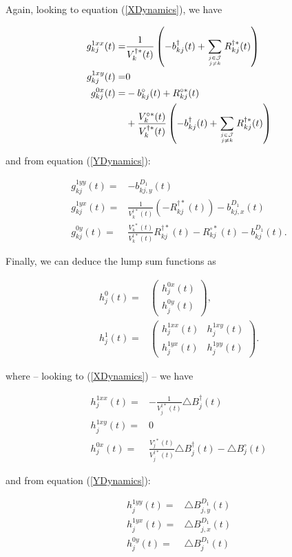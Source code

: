\documentclass{article}
\newcommand{\1}[1]{\mathbbm{1}_{\left\lbrace #1 \right\rbrace}}
\theoremstyle{break}
\theoremstyle{remark}
\numberwithin{equation}{section}
\begin{document}
\begin{appendices}
Again, looking to equation (\ref{XDynamics}), we have

\begin{align*}
	g_{kj}^{1xx}(t) =& \frac{1}{V_k^{\dagger *}(t)} \left(  -b_{kj}^\dagger(t) + \sum_{j \in \mathcal{J} \atop j \neq k} R_{kj}^{\dagger*}(t) \right) \\
	g_{kj}^{1xy}(t) =& 0\\
	g_{kj}^{0x}(t) =&   -b_{kj}^\circ(t) +   R_{kj}^{\circ*}(t) \\
	&+ \frac{V_k^{\circ *}(t)}{V_k^{\dagger *}(t)} \left(  -b_{kj}^\dagger(t) + \sum_{j \in \mathcal{J} \atop j \neq k} R_{kj}^{\dagger*}(t) \right)
\end{align*}

and from equation (\ref{YDynamics}):

\begin{align*}
	g_{kj}^{1yy}(t) =&   -b_{kj,y}^{D_1}(t) \\
	g_{kj}^{1yx}(t) =& \frac{1}{V_k^{\dagger *}(t)} \left( -  R_{kj}^{\dagger*}(t) \right) -   b_{kj,x}^{D_1}(t)\\
	g_{kj}^{0y}(t) =& \frac{V_k^{\circ *}(t)}{V_k^{\dagger *}(t)}  R_{kj}^{\dagger*}(t) - R_{kj}^{\circ*}(t) -b_{kj}^{D_1}(t).
\end{align*}

Finally, we can deduce the lump sum functions as

\begin{align*}
	h_j^0(t) =&
	\begin{pmatrix}
		h_j^{0x}(t) \\
		h_j^{0y}(t) 
	\end{pmatrix}, \\
	h_j^1(t) =&
	\begin{pmatrix}
		h_j^{1xx}(t) & h_j^{1xy}(t) \\
		h_j^{1yx}(t) & h_j^{1yy}(t)
	\end{pmatrix}.
\end{align*}

where -- looking to (\ref{XDynamics}) -- we have

\begin{align*}
	h_j^{1xx}(t) =& -\frac{1}{V_j^{\dagger *}(t)} \triangle B_j^{\dagger}(t) \\
	h_j^{1xy}(t) =& 0\\
	h_j^{0x}(t) =&  \frac{V_j^{\circ *}(t)}{V_j^{\dagger *}(t)} \triangle B_j^{\dagger}(t) - \triangle B_j^{\circ}(t)
\end{align*}

and from equation (\ref{YDynamics}):

\begin{align*}
	h_j^{1yy}(t) =&  \triangle B_{j,y}^{D_1}(t) \\
	h_j^{1yx}(t) =& \triangle B_{j,x}^{D_1}(t) \\
	h_j^{0y}(t) =&  \triangle B_{j}^{D_1}(t)
\end{align*}



\end{appendices}
\end{document}
